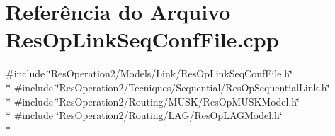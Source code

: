 \section{Referência do Arquivo Res\+Op\+Link\+Seq\+Conf\+File.\+cpp}
\label{_res_op_link_seq_conf_file_8cpp}
{\ttfamily \#include \char`\"{}Res\+Operation2/\+Models/\+Link/\+Res\+Op\+Link\+Seq\+Conf\+File.\+h\char`\"{}}\\*
{\ttfamily \#include \char`\"{}Res\+Operation2/\+Tecniques/\+Sequential/\+Res\+Op\+Sequential\+Link.\+h\char`\"{}}\\*
{\ttfamily \#include \char`\"{}Res\+Operation2/\+Routing/\+M\+U\+S\+K/\+Res\+Op\+M\+U\+S\+K\+Model.\+h\char`\"{}}\\*
{\ttfamily \#include \char`\"{}Res\+Operation2/\+Routing/\+L\+A\+G/\+Res\+Op\+L\+A\+G\+Model.\+h\char`\"{}}\\*
